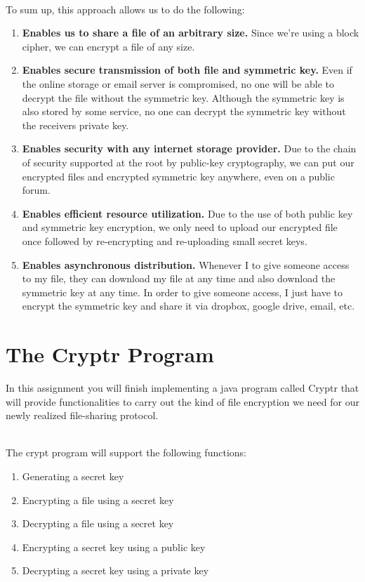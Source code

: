 \documentclass{article}
\begin{document}
\-\ \\To sum up, this approach allows us to do the following:
\begin{enumerate}
\item \textbf{Enables us to share a file of an arbitrary size.} Since we're using a block cipher, we can encrypt a file of any size. 
\item \textbf{Enables secure transmission of both file and symmetric key.} Even if the online storage or email server is compromised, no one will be able to decrypt the file without the symmetric key. Although the symmetric key is also stored by some service, no one can decrypt the symmetric key without the receivers private key.
\item \textbf{Enables security with any internet storage provider.} Due to the chain of security supported at the root by public-key cryptography, we can put our encrypted files and encrypted symmetric key anywhere, even on a public forum.
\item \textbf{Enables efficient resource utilization.} Due to the use of both public key and symmetric key encryption, we only need to upload our encrypted file once followed by re-encrypting and re-uploading small secret keys.
\item \textbf{Enables asynchronous distribution.} Whenever I to give someone access to my file, they can download my file at any time and also download the symmetric key at any time. In order to give someone access, I just have to encrypt the symmetric key and share it via dropbox, google drive, email, etc. 
\end{enumerate}



\section*{The Cryptr Program}
In this assignment you will finish implementing a java program called Cryptr that will provide functionalities to carry out the kind of file encryption we need for our newly realized file-sharing protocol.

\-\ \\\noindent The crypt program will support the following functions:
\begin{enumerate}
\item Generating a secret key
\item Encrypting a file using a secret key 
\item Decrypting a file using a secret key
\item Encrypting a secret key using a public key 
\item Decrypting a secret key using a private key
\end{enumerate}
\end{document}
